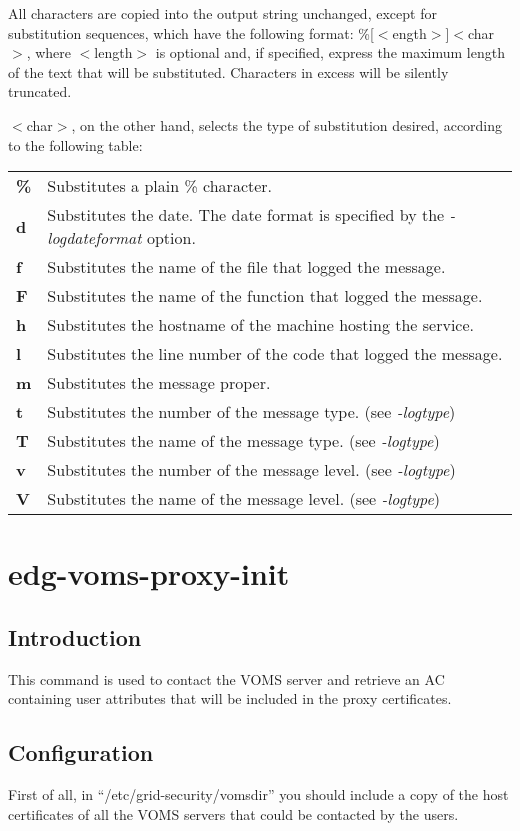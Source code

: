 \documentclass[a4paper]{book}
\begin{document}
All characters are copied into the output string unchanged, except for
substitution sequences, which have the following format:
\%[$<$ength$>$]$<$char$>$, where $<$length$>$ is optional and, if
specified, express the maximum length of the text that will be
substituted. Characters in excess will be silently truncated.

$<$char$>$, on the other hand, selects the type of substitution desired,
according to the following table:

\begin{longtable}{lp{4in}}
\textbf{\%} & Substitutes a plain \% character.\\
\textbf{d}  & Substitutes the date. The date format is specified by
              the \emph{-logdateformat} option.\\
\textbf{f}  & Substitutes the name of the file that logged the message.\\
\textbf{F}  & Substitutes the name of the function that logged the message.\\
\textbf{h}  & Substitutes the hostname of the machine hosting the service.\\
\textbf{l}  & Substitutes the line number of the code that logged the message.\\
\textbf{m}  & Substitutes the message proper.\\
\textbf{t}  & Substitutes the number of the message type. (see \emph{-logtype})\\
\textbf{T}  & Substitutes the name of the message type. (see \emph{-logtype})\\
\textbf{v}  & Substitutes the number of the message level. (see \emph{-logtype})\\
\textbf{V}  & Substitutes the name of the message level. (see \emph{-logtype})\\
\end{longtable}

\chapter{edg-voms-proxy-init}
\section{Introduction}
This command is used to contact the VOMS server and retrieve an AC
containing user attributes that will be included in the proxy
certificates.


\section{Configuration}
First of all, in ``/etc/grid-security/vomsdir'' you should include a
copy of the host certificates of all the VOMS servers that could be
contacted by the users.
\end{document}
